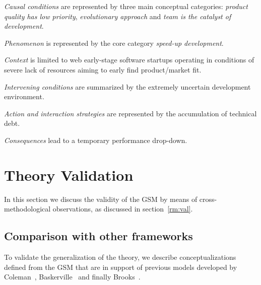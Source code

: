 \documentclass[10pt,journal,letterpaper,compsoc]{IEEEtran}
\begin{document}
\begin{compactitem}

\item \textit{Causal conditions} are represented by three main conceptual
categories: \textit{product quality has low priority}, \textit{evolutionary
approach} and \textit{team is the catalyst of development}. 
\item \textit{Phenomenon} is represented by the core category \textit{speed-up
development}. 
\item \textit{Context} is limited to web early-stage software startups 
operating in conditions of severe lack of resources aiming to early
find product/market fit. 
\item \textit{Intervening conditions} are summarized by the extremely 
uncertain development environment. 
\item \textit{Action and interaction strategies} are represented by the 
accumulation of technical debt.
\item \textit{Consequences} lead to a temporary performance drop-down.
\end{compactitem}

\section{Theory Validation} \label{res:val}

In this section we discuss the validity of the GSM by means of 
cross-methodological observations, as discussed in section~\ref{rm:val}. 


\subsection{Comparison with other frameworks}
\label{sect:theory:validation:others}

To validate the generalization of the theory, we describe conceptualizations
defined from the GSM that are in support of previous models developed by
Coleman~\cite{Coleman2007,Coleman2008a, Coleman2008}, 
Baskerville~\cite{Internet} and finally Brooks~\cite{BrooksJr1987}.
\end{document}
